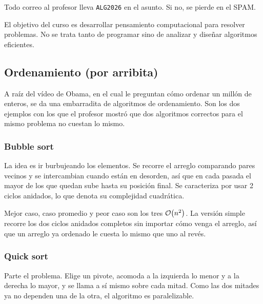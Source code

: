 \documentclass[11pt,letterpaper]{article}
\begin{document}
\begin{ojo}
  Todo correo al profesor lleva \texttt{ALG2026} en el asunto. Si no,
  se pierde en el SPAM.
\end{ojo}

El objetivo del curso es desarrollar pensamiento computacional para
resolver problemas. No se trata tanto de programar sino de analizar y
diseñar algoritmos eficientes.

\newpage


\subsection*{Ordenamiento (por arribita)}

A raíz del vídeo de Obama, en el cual le preguntan cómo ordenar un
millón de enteros, se da una embarradita de algoritmos de
ordenamiento. Son los dos ejemplos con los que el profesor mostró que
dos algoritmos correctos para el mismo problema no cuestan lo mismo.

\subsubsection*{Bubble sort}

La idea es ir burbujeando los elementos. Se recorre el arreglo
comparando pares vecinos y se intercambian cuando están en desorden,
así que en cada pasada el mayor de los que quedan sube hasta su
posición final.
Se caracteriza por usar 2 ciclos anidados, lo que denota su complejidad
cuadrática.


Mejor caso, caso promedio y peor caso son los tres $\mathcal{O}\!\left(n^2\right)$. La
versión simple recorre los dos ciclos anidados completos sin importar
cómo venga el arreglo, así que un arreglo ya ordenado le cuesta lo
mismo que uno al revés.

\subsubsection*{Quick sort}

Parte el problema. Elige un pivote, acomoda a la izquierda lo menor y a
la derecha lo mayor, y se llama a sí mismo sobre cada mitad. Como las
dos mitades ya no dependen una de la otra, el algoritmo es
paralelizable.

\vspace{2em}
\end{document}
